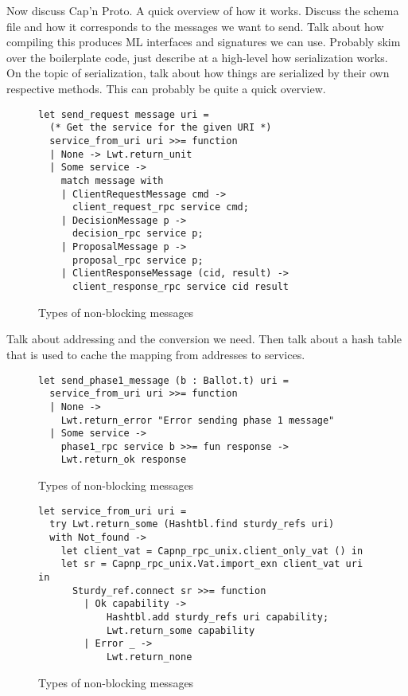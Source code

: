 Now discuss Cap'n Proto. A quick overview of how it works. Discuss the schema file and how it corresponds to the messages we want to send. Talk about how compiling this produces ML interfaces and signatures we can use. Probably skim over the boilerplate code, just describe at a high-level how serialization works. \\

On the topic of serialization, talk about how things are serialized by their own respective methods. This can probably be quite a quick overview. \\

\begin{figure}
  \begin{lstlisting}
let send_request message uri =
  (* Get the service for the given URI *)
  service_from_uri uri >>= function
  | None -> Lwt.return_unit
  | Some service ->
    match message with
    | ClientRequestMessage cmd ->
      client_request_rpc service cmd;
    | DecisionMessage p ->
      decision_rpc service p;
    | ProposalMessage p ->
      proposal_rpc service p;
    | ClientResponseMessage (cid, result) ->
      client_response_rpc service cid result
  \end{lstlisting}
  \centering
  \caption{Types of non-blocking messages}
\end{figure}

Talk about addressing and the conversion we need. Then talk about a hash table that is used to cache the mapping from addresses to services. \\

\begin{figure}
  \begin{lstlisting}
let send_phase1_message (b : Ballot.t) uri = 
  service_from_uri uri >>= function 
  | None ->
    Lwt.return_error "Error sending phase 1 message"  
  | Some service -> 
    phase1_rpc service b >>= fun response ->
    Lwt.return_ok response
  \end{lstlisting}
  \centering
  \caption{Types of non-blocking messages}
\end{figure}

\begin{figure}
  \begin{lstlisting}
let service_from_uri uri =
  try Lwt.return_some (Hashtbl.find sturdy_refs uri)
  with Not_found ->
    let client_vat = Capnp_rpc_unix.client_only_vat () in
    let sr = Capnp_rpc_unix.Vat.import_exn client_vat uri in
      Sturdy_ref.connect sr >>= function
        | Ok capability ->
            Hashtbl.add sturdy_refs uri capability;
            Lwt.return_some capability
        | Error _ -> 
            Lwt.return_none
  \end{lstlisting}
  \centering
  \caption{Types of non-blocking messages}
\end{figure}

